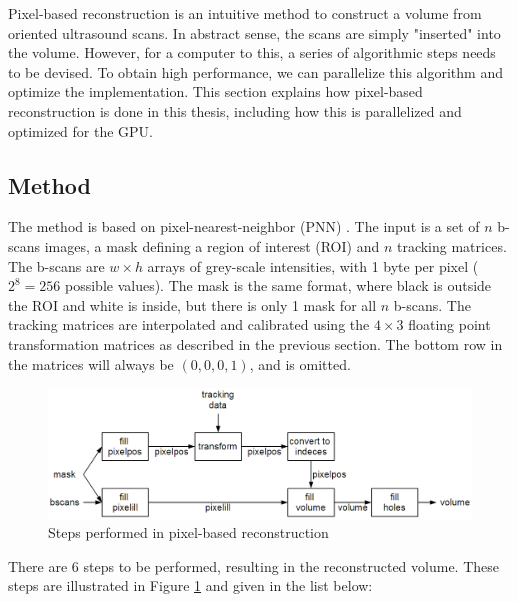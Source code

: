Pixel-based reconstruction is an intuitive method to construct a volume from oriented ultrasound scans. In abstract sense, the scans are simply "inserted" into the volume. However, for a computer to this, a series of algorithmic steps needs to be devised. To obtain high performance, we can parallelize this algorithm and optimize the implementation. This section explains how pixel-based reconstruction is done in this thesis, including how this is parallelized and optimized for the GPU.

\subsection{Method}


	The method is based on pixel-nearest-neighbor (PNN) \cite{mccann1988}. The input is a set of $n$ b-scans images, a mask defining a region of interest (ROI) and $n$ tracking matrices. The b-scans are $w \times h$ arrays of grey-scale intensities, with 1 byte per pixel ($2^8=256$ possible values). The mask is the same format, where black is outside the ROI and white is inside, but there is only 1 mask for all $n$ b-scans. The tracking matrices are interpolated and calibrated using the $4 \times 3$ floating point transformation matrices as described in the previous section. The bottom row in the matrices will always be $(0,0,0,1)$, and is omitted.
	
	\begin{figure}[h]
	\centering
	\includegraphics[width=\textwidth]{graphics/non-inc_pnn.png}
	\caption{Steps performed in pixel-based reconstruction}
	\label{fig:non-inc_pnn}
	\end{figure}
	
	There are 6 steps to be performed, resulting in the reconstructed volume. These steps are illustrated in Figure \ref{fig:non-inc_pnn} and given in the list below:
	
